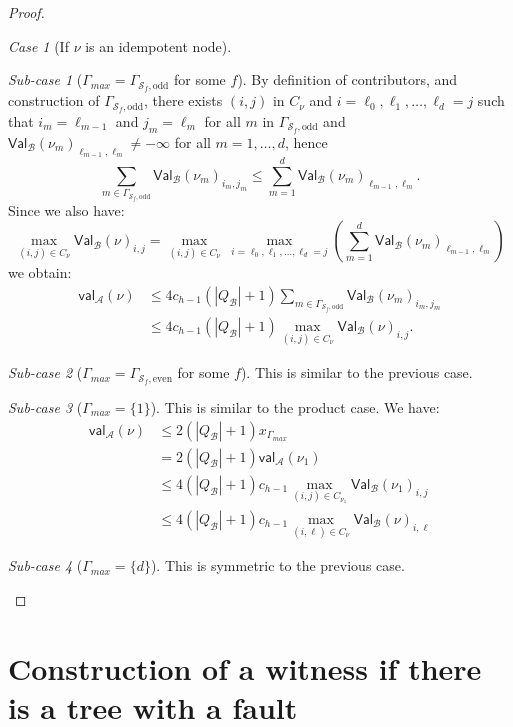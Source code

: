 \documentclass{lmcs}
\theoremstyle{remark}
\newtheorem{case}{Case}
\newtheorem{subcase}{Sub-case}[case]
\newcommand{\autA}{\mathcal{A}}
\newcommand{\autB}{\mathcal{B}}
\newcommand{\aval}{\mathsf{val}_\autA}
\newcommand{\bval}{\mathsf{Val}_\autB}
\theoremstyle{remark}
\begin{document}
\begin{proof}
\begin{case}[If $\nu$ is an idempotent node]
\begin{subcase}[$\Gamma_{max} = \Gamma_{\mathcal{S}_f,\text{odd}}$ for some $f$]
By definition of contributors, and construction of $\Gamma_{\mathcal{S}_f,\text{odd}}$, there exists $(i,j)$ in $C_{\nu}$ and $i=\ell_0, \ell_1, \ldots, \ell_d=j$ such that $i_m = \ell_{m-1}$ and $j_m = \ell_{m}$ for all $m$ in $\Gamma_{\mathcal{S}_f,\text{odd}}$ and $\bval(\nu_m)_{\ell_{m-1},\ell_{m}} \neq -\infty$ for all $m=1,\ldots,d$, hence 
\[\sum_{m\in \Gamma_{\mathcal{S}_f,\text{odd}}}\bval(\nu_m)_{i_m,j_m} \leq \sum_{m=1}^{d}\bval(\nu_m)_{\ell_{m-1},\ell_{m}}.\]
Since we also have:
$$\max_{(i,j) \in C_{\nu}} \bval(\nu)_{i,j} = \max_{(i,j) \in C_{\nu}}\  \max_{i=\ell_0, \ell_1, \ldots, \ell_d=j}\left(\sum_{m=1}^{d}\bval(\nu_m)_{\ell_{m-1},\ell_{m}}\right)$$
we obtain:
\begin{align*}
\aval(\nu) &\le 4c_{h-1}(|Q_\autB| + 1)\sum_{m\in \Gamma_{\mathcal{S}_f,\text{odd}}}\bval(\nu_m)_{i_m,j_m}
\\&\le 4c_{h-1}(|Q_\autB| + 1)\max_{(i,j) \in C_{\nu}} \bval(\nu)_{i,j}.
\end{align*}
\end{subcase}

\begin{subcase}[$\Gamma_{max} = \Gamma_{\mathcal{S}_f,\text{even}}$ for some $f$]
This is similar to the previous case.
\end{subcase}

\begin{subcase}[$\Gamma_{max} = \{1\}$]
This is similar to the product case. We have:
\begin{align*}
\aval(\nu) &\le 2(|Q_\autB| + 1)x_{\Gamma_{max}}
\\&= 2(|Q_\autB| + 1)\aval(\nu_1)
\\&\le 4(|Q_\autB| + 1)c_{h-1} \max_{(i,j) \in C_{\nu_1}} \bval(\nu_1)_{i,j}
\\&\le 4(|Q_\autB| + 1)c_{h-1} \max_{(i,\ell) \in C_{\nu}} \bval(\nu)_{i,\ell}  \tag{by definition of contributors of the left-most child.}
\end{align*}
\end{subcase}

\begin{subcase}[$\Gamma_{max} = \{d\}$]
This is symmetric to the previous case.\qedhere
\end{subcase}
\end{case}
\end{proof}


\section{Construction of a witness if there is a tree with a fault}
\label{4implies3}
\end{document}
